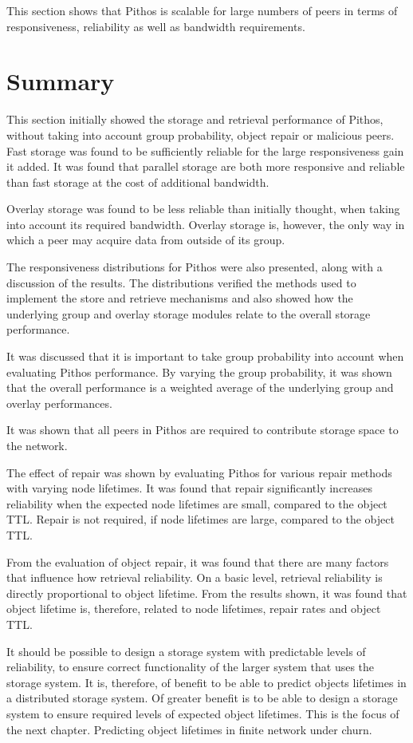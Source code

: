 This section shows that Pithos is scalable for large numbers of peers in terms of responsiveness, reliability as well as bandwidth requirements.

\section{Summary}

This section initially showed the storage and retrieval performance of Pithos, without taking into account group probability, object repair or malicious peers. Fast storage was found to be sufficiently reliable for the large responsiveness gain it added. It was found that parallel storage are both more responsive and reliable than fast storage at the cost of additional bandwidth.

Overlay storage was found to be less reliable than initially thought, when taking into account its required bandwidth. Overlay storage is, however, the only way in which a peer may acquire data from outside of its group.

The responsiveness distributions for Pithos were also presented, along with a discussion of the results. The distributions verified the methods used to implement the store and retrieve mechanisms and also showed how the underlying group and overlay storage modules relate to the overall storage performance.

It was discussed that it is important to take group probability into account when evaluating Pithos performance. By varying the group probability, it was shown that the overall performance is a weighted average of the underlying group and overlay performances.

It was shown that all peers in Pithos are required to contribute storage space to the network.

The effect of repair was shown by evaluating Pithos for various repair methods with varying node lifetimes. It was found that repair significantly increases reliability when the expected node lifetimes are small, compared to the object TTL. Repair is not required, if node lifetimes are large, compared to the object TTL.

From the evaluation of object repair, it was found that there are many factors that influence how retrieval reliability. On a basic level, retrieval reliability is directly proportional to object lifetime. From the results shown, it was found that object lifetime is, therefore, related to node lifetimes, repair rates and object TTL.

It should be possible to design a storage system with predictable levels of reliability, to ensure correct functionality of the larger system that uses the storage system. It is, therefore, of benefit to be able to predict objects lifetimes in a distributed storage system. Of greater benefit is to be able to design a storage system to ensure required levels of expected object lifetimes. This is the focus of the next chapter. Predicting object lifetimes in finite network under churn.
